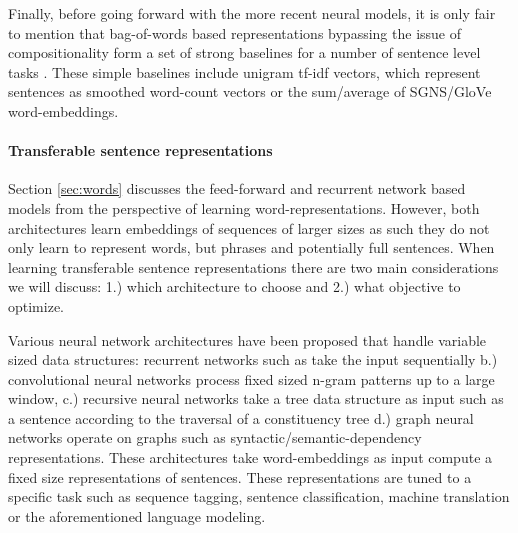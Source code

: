 Finally, before going forward with the more recent neural models,
it is only fair to mention that bag-of-words
based representations bypassing the issue of compositionality form a set of strong baselines
for a number of sentence level tasks \citep{hill2016learning}.
These simple baselines include unigram tf-idf vectors, which represent sentences as
smoothed word-count vectors or the sum/average of SGNS/GloVe word-embeddings.

\paragraph{Transferable sentence representations}
\label{sec:sentence}

Section \ref{sec:words} discusses the feed-forward \citep{bengio2003neural}
and recurrent network based models \citep{mikolov2010recurrent} from the perspective
of learning word-representations. However, both architectures learn embeddings
of sequences of larger sizes as such they do not only learn to represent
words, but phrases and potentially full sentences. When learning transferable
sentence representations there are two main considerations we will discuss:
1.) which architecture to choose and 2.) what objective to optimize.

Various neural network architectures have been proposed that
handle variable sized data structures: recurrent networks such as
take the input sequentially
b.) convolutional neural networks
\citep{kalchbrenner2014convolutional,zhang2015character,conneau2016very,chen2013learning}
process fixed sized n-gram patterns up to a large window,
c.) recursive neural networks \citep{goller1996learning.socher2011parsing,tai2015improved}
take a tree data structure as input such as a sentence according to the traversal of a
constituency tree d.) graph neural networks operate on graphs \citep{marcheggiani2017encoding} such as
syntactic/semantic-dependency representations.
These architectures take word-embeddings as input compute a fixed size representations of
sentences. These representations are tuned to a specific task such as sequence tagging,
sentence classification, machine translation or the aforementioned language modeling.


